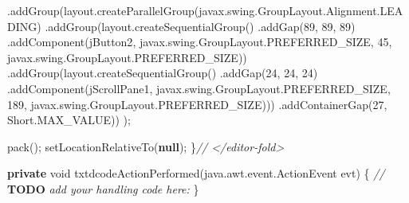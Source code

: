 \documentclass[
  10pt,
]{article}
\newenvironment{Shaded}{}{}
\newcommand{\AlertTok}[1]{\textcolor[rgb]{1.00,0.00,0.00}{\textbf{#1}}}
\newcommand{\BuiltInTok}[1]{\textcolor[rgb]{0.00,0.50,0.00}{#1}}
\newcommand{\CommentTok}[1]{\textcolor[rgb]{0.38,0.63,0.69}{\textit{#1}}}
\newcommand{\DataTypeTok}[1]{\textcolor[rgb]{0.56,0.13,0.00}{#1}}
\newcommand{\DecValTok}[1]{\textcolor[rgb]{0.25,0.63,0.44}{#1}}
\newcommand{\FunctionTok}[1]{\textcolor[rgb]{0.02,0.16,0.49}{#1}}
\newcommand{\KeywordTok}[1]{\textcolor[rgb]{0.00,0.44,0.13}{\textbf{#1}}}
\newcommand{\NormalTok}[1]{#1}
\newcommand{\OperatorTok}[1]{\textcolor[rgb]{0.40,0.40,0.40}{#1}}
\begin{document}
\begin{Shaded}
\begin{Highlighting}[numbers=left,,]
                \OperatorTok{.}\FunctionTok{addGroup}\OperatorTok{(}\NormalTok{layout}\OperatorTok{.}\FunctionTok{createParallelGroup}\OperatorTok{(}\NormalTok{javax}\OperatorTok{.}\FunctionTok{swing}\OperatorTok{.}\FunctionTok{GroupLayout}\OperatorTok{.}\FunctionTok{Alignment}\OperatorTok{.}\FunctionTok{LEADING}\OperatorTok{)}
                    \OperatorTok{.}\FunctionTok{addGroup}\OperatorTok{(}\NormalTok{layout}\OperatorTok{.}\FunctionTok{createSequentialGroup}\OperatorTok{()}
                        \OperatorTok{.}\FunctionTok{addGap}\OperatorTok{(}\DecValTok{89}\OperatorTok{,} \DecValTok{89}\OperatorTok{,} \DecValTok{89}\OperatorTok{)}
                        \OperatorTok{.}\FunctionTok{addComponent}\OperatorTok{(}\NormalTok{jButton2}\OperatorTok{,}\NormalTok{ javax}\OperatorTok{.}\FunctionTok{swing}\OperatorTok{.}\FunctionTok{GroupLayout}\OperatorTok{.}\FunctionTok{PREFERRED\_SIZE}\OperatorTok{,} \DecValTok{45}\OperatorTok{,}\NormalTok{ javax}\OperatorTok{.}\FunctionTok{swing}\OperatorTok{.}\FunctionTok{GroupLayout}\OperatorTok{.}\FunctionTok{PREFERRED\_SIZE}\OperatorTok{))}
                    \OperatorTok{.}\FunctionTok{addGroup}\OperatorTok{(}\NormalTok{layout}\OperatorTok{.}\FunctionTok{createSequentialGroup}\OperatorTok{()}
                        \OperatorTok{.}\FunctionTok{addGap}\OperatorTok{(}\DecValTok{24}\OperatorTok{,} \DecValTok{24}\OperatorTok{,} \DecValTok{24}\OperatorTok{)}
                        \OperatorTok{.}\FunctionTok{addComponent}\OperatorTok{(}\NormalTok{jScrollPane1}\OperatorTok{,}\NormalTok{ javax}\OperatorTok{.}\FunctionTok{swing}\OperatorTok{.}\FunctionTok{GroupLayout}\OperatorTok{.}\FunctionTok{PREFERRED\_SIZE}\OperatorTok{,} \DecValTok{189}\OperatorTok{,}\NormalTok{ javax}\OperatorTok{.}\FunctionTok{swing}\OperatorTok{.}\FunctionTok{GroupLayout}\OperatorTok{.}\FunctionTok{PREFERRED\_SIZE}\OperatorTok{)))}
                \OperatorTok{.}\FunctionTok{addContainerGap}\OperatorTok{(}\DecValTok{27}\OperatorTok{,} \BuiltInTok{Short}\OperatorTok{.}\FunctionTok{MAX\_VALUE}\OperatorTok{))}
        \OperatorTok{);}

        \FunctionTok{pack}\OperatorTok{();}
        \FunctionTok{setLocationRelativeTo}\OperatorTok{(}\KeywordTok{null}\OperatorTok{);}
    \OperatorTok{\}}\CommentTok{// \textless{}/editor{-}fold\textgreater{}                        }

    \KeywordTok{private} \DataTypeTok{void} \FunctionTok{txtdcodeActionPerformed}\OperatorTok{(}\NormalTok{java}\OperatorTok{.}\FunctionTok{awt}\OperatorTok{.}\FunctionTok{event}\OperatorTok{.}\FunctionTok{ActionEvent}\NormalTok{ evt}\OperatorTok{)} \OperatorTok{\{}                                         
        \CommentTok{// }\AlertTok{TODO}\CommentTok{ add your handling code here:}
    \OperatorTok{\}}                                        


\end{Highlighting}
\end{Shaded}
\end{document}

